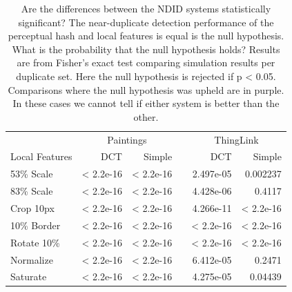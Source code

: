\documentclass[english,12pt,a4paper,pdftex,elec,utf8, table]{aaltothesis}
\begin{document}
\begin{table} \footnotesize
\caption{Are the differences between the NDID systems statistically significant? The near-duplicate detection performance of the perceptual hash and local features is equal is the null hypothesis. What is the probability that the null hypothesis holds? Results are from Fisher's exact test \cite{fisher1922interpretation} comparing simulation results per duplicate set. Here the null hypothesis is rejected if p < 0.05. Comparisons where the null hypothesis was upheld are in purple. In these cases we cannot tell if either system is better than the other.}
\label{pvalues}
\begin{center}
  \setlength\tabcolsep{3pt} %
  \begin{tabular}{@{}lrrrrr@{}}
    \toprule
    & \multicolumn{2}{c}{Paintings} &\phantom{abc} &\multicolumn{2}{c}{ThingLink}\\
\cmidrule{2-3} \cmidrule{5-6}
 Local Features & DCT & Simple &\phantom{abc} & DCT & Simple\\ \midrule
  53\% Scale   & < 2.2e-16 & < 2.2e-16 &\phantom{abc} & 2.497e-05 & 0.002237\\
  83\% Scale   & < 2.2e-16 & < 2.2e-16 &\phantom{abc} & 4.428e-06 & \cellcolor{blue!25}0.4117\\
  Crop 10px    & < 2.2e-16 & < 2.2e-16 &\phantom{abc} & 4.266e-11 & < 2.2e-16\\
  10\% Border  & < 2.2e-16 & < 2.2e-16 &\phantom{abc} & < 2.2e-16 & < 2.2e-16\\
  Rotate 10\%  & < 2.2e-16 & < 2.2e-16 &\phantom{abc} & < 2.2e-16& < 2.2e-16\\
  Normalize    & < 2.2e-16 & < 2.2e-16 &\phantom{abc} & 6.412e-05 & \cellcolor{blue!25}0.2471\\
  Saturate     & < 2.2e-16 & < 2.2e-16 &\phantom{abc} & 4.275e-05 & 0.04439\\
    \bottomrule
\end{tabular}
\end{center}\end{table}

\clearpage
\end{document}
